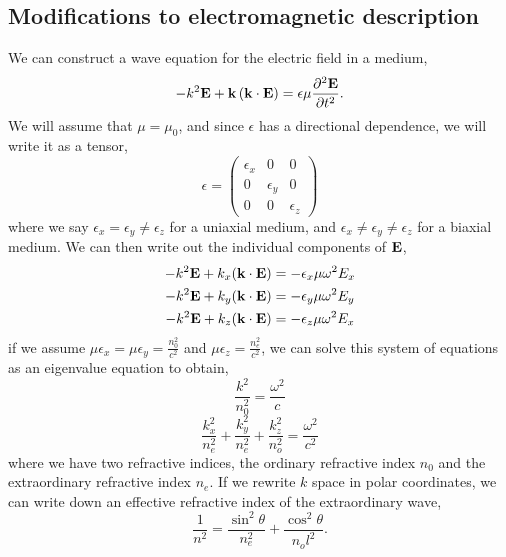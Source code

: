 \documentclass{book}
\begin{document}
{\subsection{Modifications to electromagnetic description}
We can construct a wave equation for the electric field in a medium,
\begin{equation}
	-k^2\vb{E} + \vb{k}\left(\vb{k}\cdot\vb{E}\right) = \epsilon\mu \pdv[2]{\vb{E}}{t}.
\end{equation}
We will assume that $\mu = \mu_0$, and since $\epsilon$ has a directional dependence, we will write it as a tensor,
\begin{equation}
	\epsilon = \begin{pmatrix}
		\epsilon_x & 0 & 0 \\
		0 & \epsilon_y & 0 \\
		0 & 0 & \epsilon_z
	\end{pmatrix}
\end{equation}
where we say $\epsilon_x = \epsilon_y \neq \epsilon_z$ for a uniaxial medium, and $\epsilon_x \neq \epsilon_y \neq \epsilon_z$ for a biaxial medium. We can then write out the individual components of $\vb{E}$,
\begin{align}
	-k^2\vb{E} + k_x(\vb{k}\cdot\vb{E}) &= - \epsilon_x\mu \omega^2E_x\\
	-k^2\vb{E} + k_y(\vb{k}\cdot\vb{E}) &= - \epsilon_y\mu \omega^2E_y\\
	-k^2\vb{E} + k_z(\vb{k}\cdot\vb{E}) &= - \epsilon_z\mu \omega^2E_x\\
\end{align}
if we assume $\mu\epsilon_x = \mu\epsilon_y = \frac{n_0^2}{c^2}$ and $\mu\epsilon_z = \frac{n_e^2}{c^2}$, we can solve this system of equations as an eigenvalue equation to obtain,
\begin{equation}
	\boxed{\frac{k^2}{n_0^2} = \frac{\omega^2}{c}}
\end{equation}
\begin{equation}
	\boxed{\frac{k_x^2}{n_e^2} + \frac{k_y^2}{n_e^2} + \frac{k_z^2}{n_o^2} = \frac{\omega^2}{c^2}}
\end{equation}
where we have two refractive indices, the ordinary refractive index $n_0$ and the extraordinary refractive index $n_e$. If we rewrite $k$ space in polar coordinates, we can write down an effective refractive index of the extraordinary wave,
\begin{equation}
	\boxed{\frac{1}{n^2} = \frac{\sin^2\theta}{n_e^2} + \frac{\cos^2\theta}{n_ol^2}}.
\end{equation}
}
\end{document}

